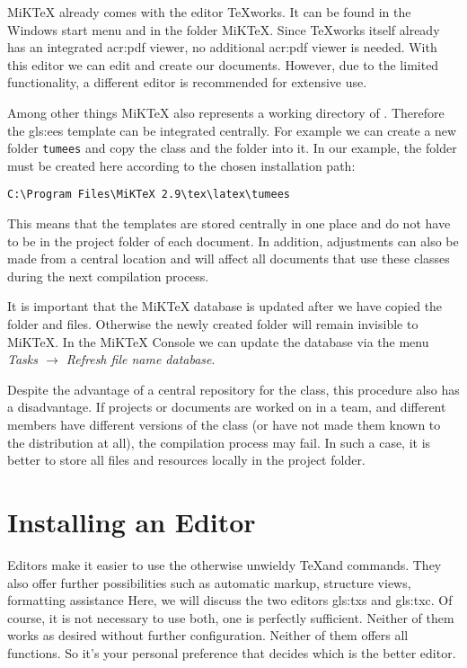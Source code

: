 MiKTeX already comes with the editor TeXworks. It can be found in the Windows start menu and in the folder MiKTeX. Since TeXworks itself already has an integrated \acs{acr:pdf} viewer, no additional \acs{acr:pdf} viewer is needed. With this editor we can edit and create our documents. However, due to the limited functionality, a different editor is recommended for extensive use.

Among other things MiKTeX also represents a working directory of \Latex. Therefore the \gls{gls:ees} template can be integrated centrally. For example we can create a new folder \texttt{tumees} and copy the class \classfile and the folder \logodir into it. In our example, the folder must be created here according to the chosen installation path:

\begin{lstlisting}[caption={Integration path for the \gls{gls:ees} template}]
	C:\Program Files\MiKTeX 2.9\tex\latex\tumees
\end{lstlisting}

This means that the templates are stored centrally in one place and do not have to be in the project folder of each \Latex document. In addition, adjustments can also be made from a central location and will affect all documents that use these classes during the next compilation process.

It is important that the MiKTeX database is updated after we have copied the folder and files. Otherwise the newly created folder will remain invisible to MiKTeX. In the MiKTeX Console we can update the database via the menu \textit{Tasks $\rightarrow$ Refresh file name database}.

Despite the advantage of a central repository for the class, this procedure also has a disadvantage. If projects or documents are worked on in a team, and different members have different versions of the class (or have not made them known to the distribution at all), the compilation process may fail. In such a case, it is better to store all files and resources locally in the project folder.



\section{Installing an Editor}
\label{sec:editor}
Editors make it easier to use the otherwise unwieldy \TeX and \Latex commands. They also offer further possibilities such as automatic markup, structure views, formatting assistance \etc Here, we will discuss the two editors \gls{gls:txs} and \gls{gls:txc}. Of course, it is not necessary to use both, one is perfectly sufficient. Neither of them works as desired without further configuration. Neither of them offers all functions. So it's your personal preference that decides which is the better editor.

